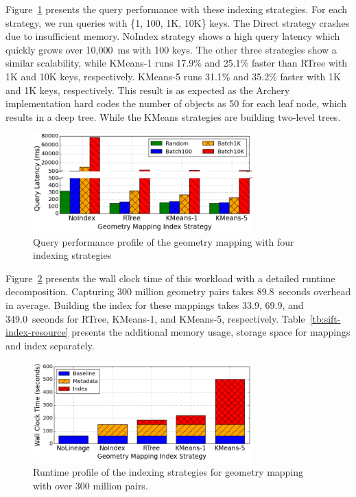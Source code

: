 \documentclass{sig-alternate}
\begin{document}
Figure~\ref{fig:sift-query} presents the query performance with these indexing strategies.
For each strategy, we run queries with \{1, 100, 1K, 10K\} keys.
The Direct strategy crashes due to insufficient memory.
NoIndex strategy shows a high query latency which quickly grows over 10,000~ms with 100 keys.
The other three strategies show a similar scalability, while KMeans-1 runs 17.9\% and 25.1\% faster than RTree with 1K and 10K keys, respectively.
KMeans-5 runs  31.1\% and 35.2\% faster with 1K and 1K keys, respectively.
This result is as expected as the Archery implementation hard codes the number of objects as 50 for each leaf node, which results in a deep tree.
While the KMeans strategies are building two-level trees.

\begin{figure}[t]
\begin{center}
    \includegraphics[width=85mm]{pictures/SIFTQuery-Time}
\caption {Query performance profile of the geometry mapping with four indexing strategies
    \label{fig:sift-query}
}
\end{center}
\end{figure}

Figure~\ref{fig:sift-time} presents the wall clock time of this workload with a detailed runtime decomposition. 
Capturing 300 million geometry pairs takes 89.8~seconds overhead in average. 
Building the index for these mappings takes 33.9, 69.9, and 349.0~seconds for RTree, KMeans-1, and KMeans-5, respectively.
Table~\ref{tb:sift-index-resource} presents the additional memory usage, storage space for mappings and
index separately.

\begin{figure}[t]
\begin{center}
    \includegraphics[width=85mm]{pictures/SIFTIndex-Time}
\caption {Runtime profile of the indexing strategies for geometry mapping with over 300 million pairs.
    \label{fig:sift-time}
}
\end{center}
\end{figure}
\end{document}
